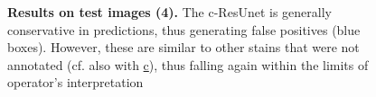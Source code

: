 \begin{figure}[ht]\ContinuedFloat
\centering
{}
\caption{\textbf{Results on test images (4).}
The c-ResUnet is generally conservative in predictions, thus generating false positives (blue boxes).
However, these are similar to other stains that were not annotated (cf. also with \hyperref[fig:predictions:false-positives]{c}), thus falling again within the limits of operator's interpretation
} 
\end{figure}












